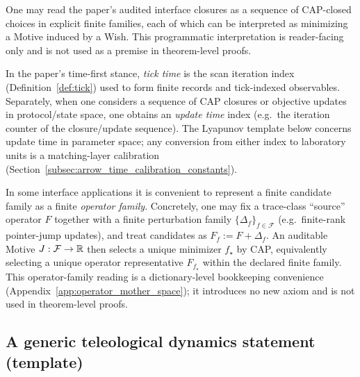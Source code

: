 \begin{remark}\label{rem:wish_motive_programmatic}
\AuditTag One may read the paper's audited interface closures as a sequence of CAP-closed choices in explicit finite families, each of which can be interpreted as minimizing a Motive induced by a Wish.
This programmatic interpretation is reader-facing only and is not used as a premise in theorem-level proofs.
\end{remark}

\begin{remark}\label{rem:update_time_vs_tick_time}
\AuditTag In the paper's time-first stance, \emph{tick time} is the scan iteration index (Definition~\ref{def:tick}) used to form finite records and tick-indexed observables.
Separately, when one considers a sequence of CAP closures or objective updates in protocol/state space, one obtains an \emph{update time} index (e.g.\ the iteration counter of the closure/update sequence).
The Lyapunov template below concerns update time in parameter space; any conversion from either index to laboratory units is a matching-layer calibration (Section~\ref{subsec:arrow_time_calibration_constants}).
\end{remark}

\begin{remark}
\label{rem:wish_motive_operator_family_reading}
\AuditTag In some interface applications it is convenient to represent a finite candidate family as a finite \emph{operator family}.
Concretely, one may fix a trace-class ``source'' operator $F$ together with a finite perturbation family $\{\Delta_f\}_{f\in\mathcal{F}}$ (e.g.\ finite-rank pointer-jump updates), and treat candidates as $F_f:=F+\Delta_f$.
An auditable Motive $J:\mathcal{F}\to\mathbb{R}$ then selects a unique minimizer $f_\star$ by CAP, equivalently selecting a unique operator representative $F_{f_\star}$ within the declared finite family.
This operator-family reading is a dictionary-level bookkeeping convenience (Appendix~\ref{app:operator_mother_space}); it introduces no new axiom and is not used in theorem-level proofs.
\end{remark}

\subsection{A generic teleological dynamics statement (template)}\label{subsec:wish_motive_generic_dynamics}

